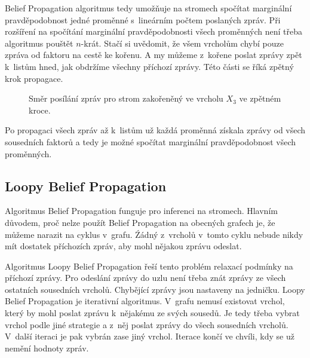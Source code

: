 Belief Propagation algoritmus tedy umožňuje na stromech spočítat marginální pravděpodobnost jedné proměnné s~lineárním počtem poslaných zpráv.
Při rozšíření na spočítání marginální pravděpodobnosti všech proměnných není třeba algoritmus pouštět $n$-krát.
Stačí si uvědomit, že všem vrcholům chybí pouze zpráva od faktoru na cestě ke kořenu.
A my můžeme z~kořene poslat zprávy zpět k~listům hned, jak obdržíme všechny příchozí zprávy.
Této části se říká zpětný krok propagace.

\begin{figure}[H]
\begin{center}
\end{center}
\caption{Směr posílání zpráv pro strom zakořeněný ve vrcholu $X_3$ ve zpětném kroce.}
\end{figure}

Po propagaci všech zpráv až k~listům už každá proměnná získala zprávy od všech sousedních faktorů a tedy je možné spočítat marginální pravděpodobnost všech proměnných.

\subsection{Loopy Belief Propagation}
\label{sec:lbp}

Algoritmus Belief Propagation funguje pro inferenci na stromech.
Hlavním důvodem, proč nelze použít Belief Propagation na obecných grafech je, že můžeme narazit na cyklus v~grafu.
Źádný z~vrcholů v~tomto cyklu nebude nikdy mít dostatek příchozích zpráv, aby mohl nějakou zprávu odeslat.

Algoritmus Loopy Belief Propagation řeší tento problém relaxací podmínky na příchozí zprávy.
Pro odeslání zprávy do uzlu není třeba znát zprávy ze všech ostatních sousedních vrcholů.
Chybějící zprávy jsou nastaveny na jedničku.
Loopy Belief Propagation je iterativní algoritmus.
V~grafu nemusí existovat vrchol, který by mohl poslat zprávu k~nějakému ze svých sousedů.
Je tedy třeba vybrat vrchol podle jiné strategie a z~něj poslat zprávy do všech sousedních vrcholů.
V~další iteraci je pak vybrán zase jiný vrchol.
Iterace končí ve chvíli, kdy se už nemění hodnoty zpráv.

